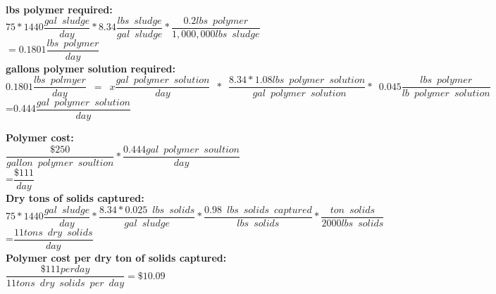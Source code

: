 \documentclass{article}
\begin{document}
\begin{enumerate}
\vspace{0.25cm}
\textbf{lbs polymer required:}\\
\vspace{0.25cm}
$75*1440 \dfrac{gal \enspace sludge}{day}* 8.34 \dfrac{lbs \enspace sludge}{gal \enspace sludge} *\dfrac{0.2lbs \enspace polymer}{1,000,000 lbs \enspace sludge}$\\
\vspace{0.25cm}
$= 0.1801 \dfrac{lbs \enspace polymer}{day}$\\

\vspace{0.25cm}
\textbf{gallons polymer solution required:}\\
\vspace{0.25cm}
$0.1801 \dfrac{lbs \enspace polmyer}{day}\enspace=\enspace x \dfrac{gal \enspace polymer \enspace solution}{day} \enspace * \enspace \dfrac{8.34*1.08lbs \enspace polymer \enspace solution}{\enspace gal \enspace polymer \enspace solution}* \enspace 0.045 \dfrac{lbs \enspace polymer}{lb \enspace polymer \enspace solution}$\\
\vspace{0.25cm}
=0.444$\dfrac{gal \enspace polymer \enspace solution}{day}$
\vspace{0.25cm}

\textbf{Polymer cost:}\\
$\dfrac{\$250}{gallon \enspace polymer \enspace soultion}*\dfrac{0.444 gal \enspace polymer \enspace soultion}{day}$\\
\vspace{0.25cm}
=$\dfrac{\$111}{day}$\\
\vspace{0.25cm}
\textbf{Dry tons of solids captured:}\\
$ 75*1440\dfrac{gal \enspace sludge}{day}*\dfrac{8.34*0.025\enspace lbs \enspace solids}{gal \enspace sludge}*\dfrac{0.98\enspace lbs \enspace solids \enspace captured}{lbs \enspace solids}*\dfrac{ton \enspace solids}{2000 lbs \enspace solids}$\\
\vspace{0.25cm}
=$\dfrac{11tons \enspace dry \enspace solids}{day}$\\
\vspace{0.25cm}
\textbf{Polymer cost per dry ton of solids captured:}\\
\vspace{0.25cm}
$\dfrac{\$111 per day}{11 tons \enspace dry \enspace solids \enspace per \enspace day}= \boxed{\$10.09}$


\end{enumerate}
\end{document}
